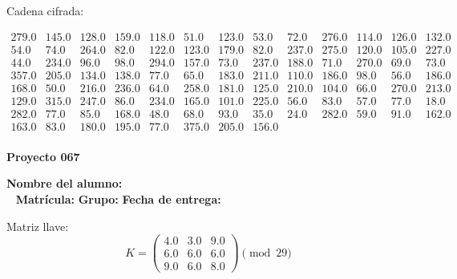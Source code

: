 \documentclass[12pt]{article}
\begin{document}
Cadena cifrada:
\begin{center}
$\begin{array}{lllllllllllll}
279.0 & 145.0 & 128.0 & 159.0 & 118.0 & 51.0 & 123.0 & 53.0 & 72.0 & 276.0 & 114.0 & 126.0 & 132.0\\
54.0 & 74.0 & 264.0 & 82.0 & 122.0 & 123.0 & 179.0 & 82.0 & 237.0 & 275.0 & 120.0 & 105.0 & 227.0\\
44.0 & 234.0 & 96.0 & 98.0 & 294.0 & 157.0 & 73.0 & 237.0 & 188.0 & 71.0 & 270.0 & 69.0 & 73.0\\
357.0 & 205.0 & 134.0 & 138.0 & 77.0 & 65.0 & 183.0 & 211.0 & 110.0 & 186.0 & 98.0 & 56.0 & 186.0\\
168.0 & 50.0 & 216.0 & 236.0 & 64.0 & 258.0 & 181.0 & 125.0 & 210.0 & 104.0 & 66.0 & 270.0 & 213.0\\
129.0 & 315.0 & 247.0 & 86.0 & 234.0 & 165.0 & 101.0 & 225.0 & 56.0 & 83.0 & 57.0 & 77.0 & 18.0\\
282.0 & 77.0 & 85.0 & 168.0 & 48.0 & 68.0 & 93.0 & 35.0 & 24.0 & 282.0 & 59.0 & 91.0 & 162.0\\
163.0 & 83.0 & 180.0 & 195.0 & 77.0 & 375.0 & 205.0 & 156.0\\
\end{array}$
\end{center}

\newpage


\textbf{Proyecto 067}

\textbf{Nombre del alumno:} \underline{\hspace{13cm}}\\\
\vspace{1cm}
\textbf{Matrícula:} \underline{\hspace{4cm}} \hspace{1cm}
\textbf{Grupo:} \underline{\hspace{2cm}}
\textbf{Fecha de entrega:} \underline{\hspace{2cm}}

\medskip

Matriz llave:
\[
K = \begin{pmatrix}
4.0 & 3.0 & 9.0\\
6.0 & 6.0 & 6.0\\
9.0 & 6.0 & 8.0
\end{pmatrix} \pmod{29}
\]
\end{document}
